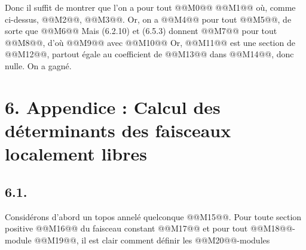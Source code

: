 
Donc il suffit de montrer que l'on a pour tout @@M0@@
@@M1@@
où, comme ci-dessus, @@M2@@, @@M3@@. Or, on a
@@M4@@
pour tout @@M5@@, de sorte que
@@M6@@
Mais (6.2.10) et (6.5.3) donnent
@@M7@@
pour tout @@M8@@, d'où
@@M9@@
avec
@@M10@@
Or, @@M11@@ est une section de @@M12@@, partout égale au coefficient de @@M13@@ dans @@M14@@, donc nulle. On a gagné.

\section*{6. Appendice : Calcul des déterminants des faisceaux localement libres}

\subsection*{6.1.}
Considérons d'abord un topos annelé quelconque @@M15@@. Pour toute section positive @@M16@@ du faisceau constant @@M17@@ et pour tout @@M18@@-module @@M19@@, il est clair comment définir les @@M20@@-modules
